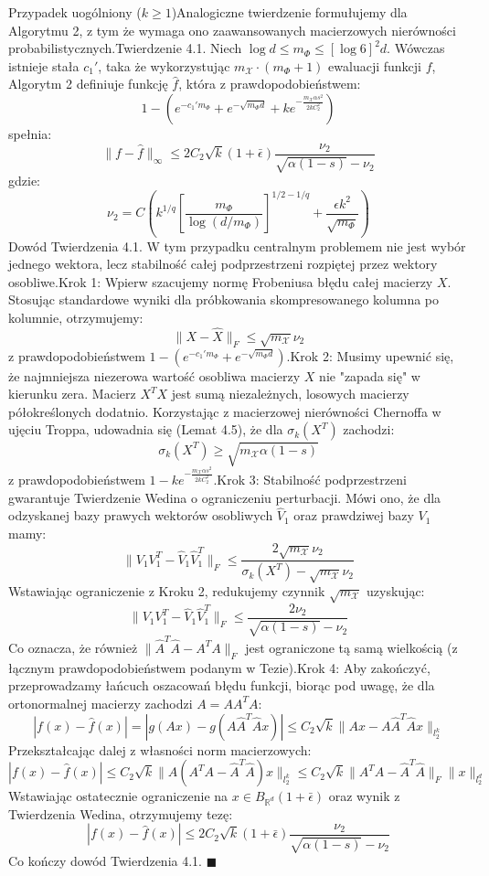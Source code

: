Przypadek uogólniony ($k \ge 1$)Analogiczne twierdzenie formułujemy dla Algorytmu 2, z tym że wymaga ono zaawansowanych macierzowych nierówności probabilistycznych.Twierdzenie 4.1. Niech $\log d \le m_\Phi \le [\log 6]^2 d$. Wówczas istnieje stała $c_1'$, taka że wykorzystując $m_\mathcal{X} \cdot (m_\Phi + 1)$ ewaluacji funkcji $f$, Algorytm 2 definiuje funkcję $\hat{f}$, która z prawdopodobieństwem:
$$1 - \left(e^{-c_1' m_\Phi} + e^{-\sqrt{m_\Phi d}} + k e^{-\frac{m_\mathcal{X} \alpha s^2}{2kC_2^2}}\right)$$spełnia:
$$\|f - \hat{f}\|_\infty \le 2C_2\sqrt{k}(1+\bar{\epsilon})\frac{\nu_2}{\sqrt{\alpha(1-s)} - \nu_2}$$gdzie:
$$\nu_2 = C\left(k^{1/q}\left[\frac{m_\Phi}{\log(d/m_\Phi)}\right]^{1/2 - 1/q} + \frac{\epsilon k^2}{\sqrt{m_\Phi}}\right)$$Dowód Twierdzenia 4.1.
W tym przypadku centralnym problemem nie jest wybór jednego wektora, lecz stabilność całej podprzestrzeni rozpiętej przez wektory osobliwe.Krok 1: Wpierw szacujemy normę Frobeniusa błędu całej macierzy $X$. Stosując standardowe wyniki dla próbkowania skompresowanego kolumna po kolumnie, otrzymujemy:
$$\|X - \hat{X}\|_F \le \sqrt{m_\mathcal{X}}\nu_2$$z prawdopodobieństwem $1 - (e^{-c_1' m_\Phi} + e^{-\sqrt{m_\Phi d}})$.Krok 2: Musimy upewnić się, że najmniejsza niezerowa wartość osobliwa macierzy $X$ nie "zapada się" w kierunku zera. Macierz $X^T X$ jest sumą niezależnych, losowych macierzy półokreślonych dodatnio. Korzystając z macierzowej nierówności Chernoffa w ujęciu Troppa, udowadnia się (Lemat 4.5), że dla $\sigma_k(X^T)$ zachodzi:
$$\sigma_k(X^T) \ge \sqrt{m_\mathcal{X}\alpha(1-s)}$$z prawdopodobieństwem $1 - k e^{-\frac{m_\mathcal{X} \alpha s^2}{2kC_2^2}}$.Krok 3: Stabilność podprzestrzeni gwarantuje Twierdzenie Wedina o ograniczeniu perturbacji. Mówi ono, że dla odzyskanej bazy prawych wektorów osobliwych $\hat{V}_1$ oraz prawdziwej bazy $V_1$ mamy:
$$\|V_1 V_1^T - \hat{V}_1 \hat{V}_1^T\|_F \le \frac{2\sqrt{m_\mathcal{X}}\nu_2}{\sigma_k(X^T) - \sqrt{m_\mathcal{X}}\nu_2}$$Wstawiając ograniczenie z Kroku 2, redukujemy czynnik $\sqrt{m_\mathcal{X}}$ uzyskując:
$$\|V_1 V_1^T - \hat{V}_1 \hat{V}_1^T\|_F \le \frac{2\nu_2}{\sqrt{\alpha(1-s)} - \nu_2}$$Co oznacza, że również $\|\hat{A}^T \hat{A} - A^T A\|_F$ jest ograniczone tą samą wielkością (z łącznym prawdopodobieństwem podanym w Tezie).Krok 4: Aby zakończyć, przeprowadzamy łańcuch oszacowań błędu funkcji, biorąc pod uwagę, że dla ortonormalnej macierzy zachodzi $A = A A^T A$:
$$|f(x) - \hat{f}(x)| = |g(Ax) - g(A\hat{A}^T \hat{A}x)| \le C_2\sqrt{k} \|Ax - A\hat{A}^T\hat{A}x\|_{l_2^k}$$Przekształcając dalej z własności norm macierzowych:
$$|f(x) - \hat{f}(x)| \le C_2\sqrt{k} \|A(A^T A - \hat{A}^T \hat{A})x\|_{l_2^k} \le C_2\sqrt{k} \|A^T A - \hat{A}^T \hat{A}\|_F \|x\|_{l_2^d}$$Wstawiając ostatecznie ograniczenie na $x \in B_{\mathbb{R}^d}(1+\bar{\epsilon})$ oraz wynik z Twierdzenia Wedina, otrzymujemy tezę:
$$|f(x) - \hat{f}(x)| \le 2C_2\sqrt{k}(1+\bar{\epsilon})\frac{\nu_2}{\sqrt{\alpha(1-s)} - \nu_2}$$Co kończy dowód Twierdzenia 4.1. $\blacksquare$